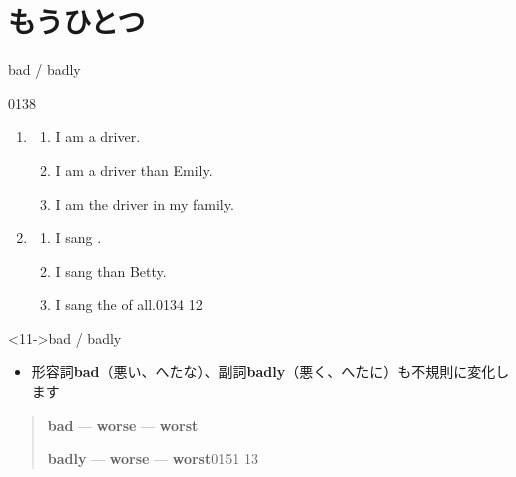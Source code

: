 \documentclass[aspectratio=169,xcolor={dvipsnames,table}]{beamer}
\begin{document}
\section{もうひとつ}
\begin{frame}[plain]{bad /  badly}

\textdbend\mbox{}\hfill{\tiny 0138}\,{\scriptsize {}}

\begin{enumerate}[<+->]
 \item \begin{enumerate}
	\item<1-> I am a  driver.\hfill{}
	\item<2-> I am a  driver than Emily.\hfill{}
	\item<4-> I am the  driver in my family.\hfill{}
       \end{enumerate}
 \item \begin{enumerate}
	\item<6-> I sang .\hfill{}
	\item<7-> I sang  than Betty.
	\item<9-> I sang the  of all.\hfill{\tiny 0134}\,{\scriptsize {}\,{\tiny 12}}


       \end{enumerate}
\end{enumerate} 



\begin{block}<11->{bad / badly}\small
\begin{itemize}[square]\small
 \item 形容詞\textbf{bad}（悪い、へたな）、副詞\textbf{badly}（悪く、へたに）も不規則に変化します
\end{itemize}

\begin{quotation}
\textbf{bad\phantom{ly}} --- \textbf{worse} --- \textbf{worst}

\textbf{badly} --- \textbf{worse} --- \textbf{worst}\hfill{\tiny 0151}\,{\scriptsize {}\,{\tiny 13}}
\end{quotation}
\end{block}

\end{frame}
\end{document}
